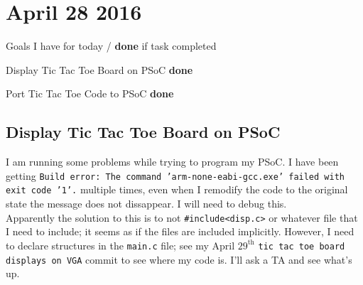 \documentclass[12pt,twoside]{article}
\newenvironment{tight_itemize}{
\begin{itemize}
  \setlength{\itemsep}{0pt}
  \setlength{\parskip}{0pt}
}{\end{itemize}}
\begin{document}

\newpage
\section{April 28 2016}

Goals I have for today / {\bf done} if task completed
\begin{tight_itemize}
\item Display Tic Tac Toe Board on PSoC {\bf done}
\item Port Tic Tac Toe Code to PSoC {\bf done}
\end{tight_itemize}

\subsection{Display Tic Tac Toe Board on PSoC}
I am running some problems while trying to program my PSoC. I have been getting \texttt{Build error: The command 'arm-none-eabi-gcc.exe' failed with exit code '1'.} multiple times, even when I remodify the code to the original state the message does not dissappear. I will need to debug this.
\\ Apparently the solution to this is to not \texttt{\#include<disp.c>} or whatever file that I need to include; it seems as if the files are included implicitly. However, I need to declare structures in the \texttt{main.c} file; see my April $29^{\text{th}}$ \texttt{tic tac toe board displays on VGA} commit to see where my code is. I'll ask a TA and see what's up. 
\end{document}
